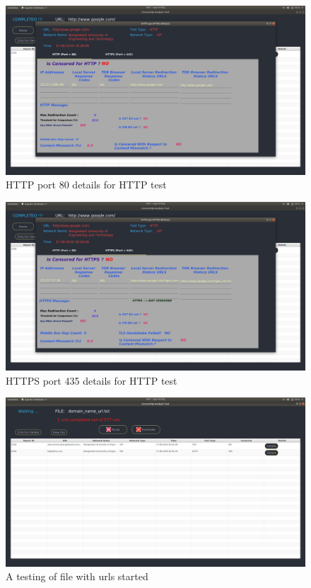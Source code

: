 \begin{figure}[h]
    \centering
    \includegraphics[width=\textwidth]{usersite/24httpdetails.png}
    \caption{HTTP port 80 details for HTTP test}
    \label{fig:user23}
\end{figure}

\begin{figure}[h]
    \centering
    \includegraphics[width=\textwidth]{usersite/25httpsdetails.png}
    \caption{HTTPS port 435 details for HTTP test}
    \label{fig:user24}
\end{figure}

\begin{figure}[h]
    \centering
    \includegraphics[width=\textwidth]{usersite/29filerunnin.png}
    \caption{A testing of file with urls started}
    \label{fig:user28}
\end{figure}


